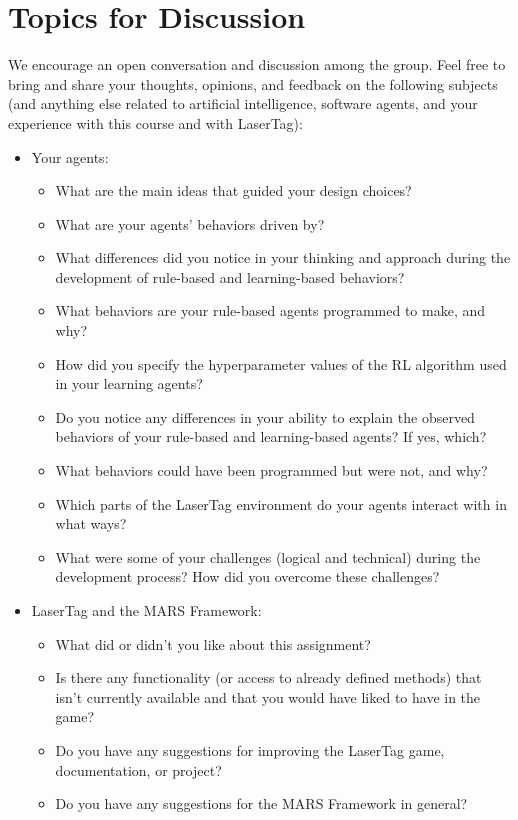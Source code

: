 \documentclass[
    a4paper,
    english,
    DIV=16,
    11pt,
    parskip=half,
]{scrartcl}
\begin{document}
\section*{Topics for Discussion}
We encourage an open conversation and discussion among the group. Feel free to bring and share your thoughts, opinions, and feedback on the following subjects (and anything else related to artificial intelligence, software agents, and your experience with this course and with LaserTag):
\begin{itemize}
  \item Your agents:
  \begin{itemize}
    \item What are the main ideas that guided your design choices?
    \item What are your agents' behaviors driven by?
    \item What differences did you notice in your thinking and approach during the development of rule-based and learning-based behaviors?
    \item What behaviors are your rule-based agents programmed to make, and why?
    \item How did you specify the hyperparameter values of the RL algorithm used in your learning agents?
    \item Do you notice any differences in your ability to explain the observed behaviors of your rule-based and learning-based agents? If yes, which?
    \item What behaviors could have been programmed but were not, and why?
    \item Which parts of the LaserTag environment do your agents interact with in what ways?
    \item What were some of your challenges (logical and technical) during the development process? How did you overcome these challenges?
  \end{itemize}
  \item LaserTag and the MARS Framework:
  \begin{itemize}
    \item What did or didn't you like about this assignment?
    \item Is there any functionality (or access to already defined methods) that isn't currently available and that you would have liked to have in the game?
    \item Do you have any suggestions for improving the LaserTag game, documentation, or project?
    \item Do you have any suggestions for the MARS Framework in general?
  \end{itemize}
\end{itemize}
\end{document}
